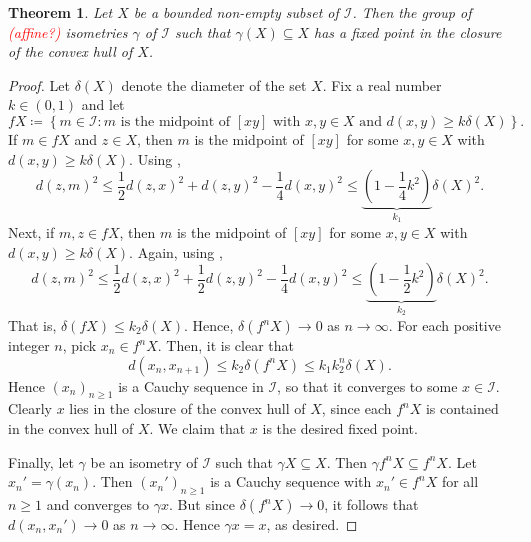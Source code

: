 \documentclass{article}
\theoremstyle{thmstyle}
\newtheorem{theorem}{Theorem}[section]
\theoremstyle{defstyle}
\newcommand{\scrI}{\mathscr{I}}
\renewcommand{\le}{\leqslant}
\renewcommand{\ge}{\geqslant}
\begin{document}
\begin{theorem}
    Let $X$ be a bounded non-empty subset of $\scrI$. Then the group of \textcolor{red}{(affine?)} isometries $\gamma$ of $\scrI$ such that $\gamma(X)\subseteq X$ has a fixed point in the closure of the convex hull of $X$.
\end{theorem}
\begin{proof}
    Let $\delta(X)$ denote the diameter of the set $X$. Fix a real number $k\in (0, 1)$ and let 
    \begin{equation*}
    fX\coloneq\left\{m\in\scrI\colon m\text{ is the midpoint of }[xy]\text{ with }x,y\in X\text{ and }d(x, y)\ge k\delta(X)\right\}.
    \end{equation*}
    If $m\in fX$ and $z\in X$, then $m$ is the midpoint of $[xy]$ for some $x,y\in X$ with $d(x, y)\ge k\delta(X)$. Using , 
    \begin{equation*}
    d(z, m)^2\le\frac{1}{2}d(z, x)^2 + d(z, y)^2 - \frac{1}{4}d(x, y)^2\le\underbrace{\left(1 - \frac{1}{4}k^2\right)}_{k_1}\delta(X)^2.
    \end{equation*}
    Next, if $m, z\in fX$, then $m$ is the midpoint of $[xy]$ for some $x,y\in X$ with $d(x, y)\ge k\delta(X)$.  Again, using , 
    \begin{equation*}
        d(z, m)^2\le\frac{1}{2}d(z, x)^2 + \frac{1}{2}d(z, y)^2 - \frac{1}{4}d(x, y)^2\le\underbrace{\left(1 - \frac{1}{2}k^2\right)}_{k_2}\delta(X)^2.
    \end{equation*}
    That is, $\delta(fX)\le k_2\delta(X)$. Hence, $\delta(f^nX)\to 0$ as $n\to\infty$. For each positive integer $n$, pick $x_n\in f^nX$. Then, it is clear that 
    \begin{equation*}
        d(x_n, x_{n + 1})\le k_2\delta\left(f^n X\right)\le k_1k_2^n\delta(X).
    \end{equation*}
    Hence $(x_n)_{n\ge 1}$ is a Cauchy sequence in $\scrI$, so that it converges to some $x\in\scrI$. Clearly $x$ lies in the closure of the convex hull of $X$, since each $f^nX$ is contained in the convex hull of $X$. We claim that $x$ is the desired fixed point.

    Finally, let $\gamma$ be an isometry of $\scrI$ such that $\gamma X\subseteq X$. Then $\gamma f^nX\subseteq f^nX$. Let $x_n' = \gamma(x_n)$. Then $(x_n')_{n\ge 1}$ is a Cauchy sequence with $x_n'\in f^nX$ for all $n\ge 1$ and converges to $\gamma x$. But since $\delta(f^n X)\to 0$, it follows that $d(x_n, x_n')\to 0$ as $n\to\infty$. Hence $\gamma x = x$, as desired.
\end{proof}
\end{document}
